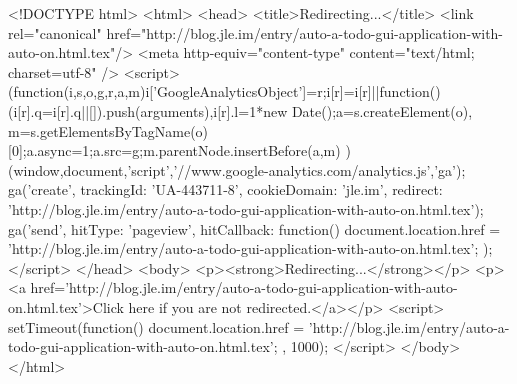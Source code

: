 <!DOCTYPE html>
<html>
<head>
<title>Redirecting...</title>
<link rel="canonical" href="http://blog.jle.im/entry/auto-a-todo-gui-application-with-auto-on.html.tex"/>
<meta http-equiv="content-type" content="text/html; charset=utf-8" />
<script>
(function(i,s,o,g,r,a,m){i['GoogleAnalyticsObject']=r;i[r]=i[r]||function(){
(i[r].q=i[r].q||[]).push(arguments)},i[r].l=1*new Date();a=s.createElement(o),
m=s.getElementsByTagName(o)[0];a.async=1;a.src=g;m.parentNode.insertBefore(a,m)
})(window,document,'script','//www.google-analytics.com/analytics.js','ga');
ga('create', { trackingId: 'UA-443711-8', cookieDomain: 'jle.im', redirect: 'http://blog.jle.im/entry/auto-a-todo-gui-application-with-auto-on.html.tex'});
ga('send', { hitType: 'pageview', hitCallback: function() { document.location.href = 'http://blog.jle.im/entry/auto-a-todo-gui-application-with-auto-on.html.tex'; } });
</script>
</head>
<body>
  <p><strong>Redirecting...</strong></p>
  <p><a href='http://blog.jle.im/entry/auto-a-todo-gui-application-with-auto-on.html.tex'>Click here if you are not redirected.</a></p>
  <script>
    setTimeout(function() { document.location.href = 'http://blog.jle.im/entry/auto-a-todo-gui-application-with-auto-on.html.tex'; }, 1000);
  </script>
</body>
</html>
